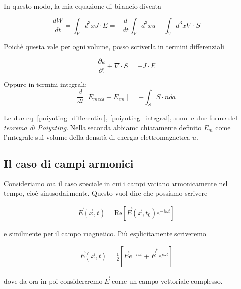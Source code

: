 \documentclass{report}
\begin{document}
In questo modo, la mia equazione di bilancio diventa 

\begin{equation}
    \frac{dW}{dt} = \int_V d^3x J \cdot E = -\frac{d}{dt}\int_V d^3x u - \int_V d^3x \nabla \cdot S
\end{equation}

Poichè questa vale per ogni volume, posso scriverla in termini differenziali

\begin{tcolorbox}[colback=doc!15, colframe=black, boxrule=1pt]
\begin{equation}
    \label{poiynting_differential}
    \frac{\partial u}{\partial t} + \nabla \cdot S = -J \cdot E 
\end{equation}
\end{tcolorbox}

Oppure in termini integrali: 
\begin{equation}
    \label{poiynting_integral}
    \frac{d}{dt}\left[E_{mech} + E_{em}\right] = -\int_S S\cdot n da
\end{equation}


Le due eq. \ref{poiynting_differential}, \ref{poiynting_integral}, sono le due forme del \emph{teorema di Poiynting}. Nella seconda abbiamo chiaramente definito $E_m$ come l'integrale sul volume della densità di energia elettromagnetica $u$.\\

\subsection{Il caso di campi armonici}

Consideriamo ora il caso speciale in cui i campi variano armonicamente nel tempo, cioè sinusodailmente. Questo vuol dire che possiamo scrivere 

\begin{align}
    \vec{E}(\vec{x}, t) = \text{Re}\left[\vec{E}(\vec{x}, t_0)e^{-i\omega t}\right] 
\end{align}

e similmente per il campo magnetico. Più esplicitamente scriveremo 

\begin{align}
    \vec{E}(\vec{x}, t) = \frac{1}{2}\left[\vec{E}e^{-i\omega t} + \vec{E}^* e^{i\omega t}\right] 
\end{align}

dove da ora in poi considereremo \(\vec{E}\) come un campo vettoriale complesso. \\
\end{document}
